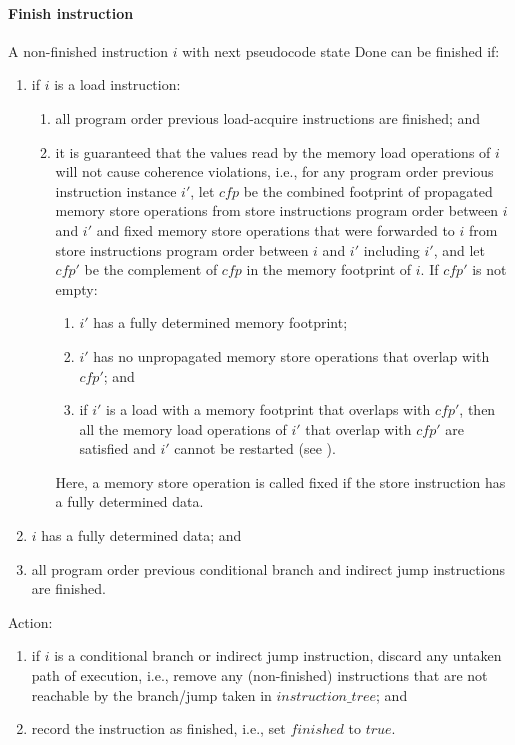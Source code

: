 \paragraph{Finish instruction}\label{omm:thread:finish}
A non-finished instruction $i$ with next pseudocode state {\sc Done} can be finished if:
\begin{enumerate}
\item if $i$ is a load instruction:
  \begin{enumerate}
  \item all program order previous load-acquire instructions are finished; and
  \item it is guaranteed that the values read by the memory load operations of $i$ will not cause coherence violations, i.e., for any program order previous instruction instance $i'$, let $cfp$ be the combined footprint of propagated memory store operations from store instructions program order between $i$ and $i'$ and fixed memory store operations that were forwarded to $i$ from store instructions program order between $i$ and $i'$ including $i'$, and let $cfp'$ be the complement of $cfp$ in the memory footprint of $i$.
  If $cfp'$ is not empty:
    \begin{enumerate}
    \item $i'$ has a fully determined memory footprint;
    \item $i'$ has no unpropagated memory store operations that overlap with $cfp'$; and
    \item if $i'$ is a load with a memory footprint that overlaps with $cfp'$, then all the memory load operations of $i'$ that overlap with $cfp'$ are satisfied and $i'$ cannot be restarted (see ).
    \end{enumerate}
  Here, a memory store operation is called fixed if the store instruction has a fully determined data.
  \end{enumerate}
\item $i$ has a fully determined data; and
\item all program order previous conditional branch and indirect jump instructions are finished.
\end{enumerate}
Action:
\begin{enumerate}
\item if $i$ is a conditional branch or indirect jump instruction, discard any untaken path of execution, i.e., remove any (non-finished) instructions that are not reachable by the branch/jump taken in $instruction\_tree$; and
\item record the instruction as finished, i.e., set $finished$ to $true$.
\end{enumerate}


